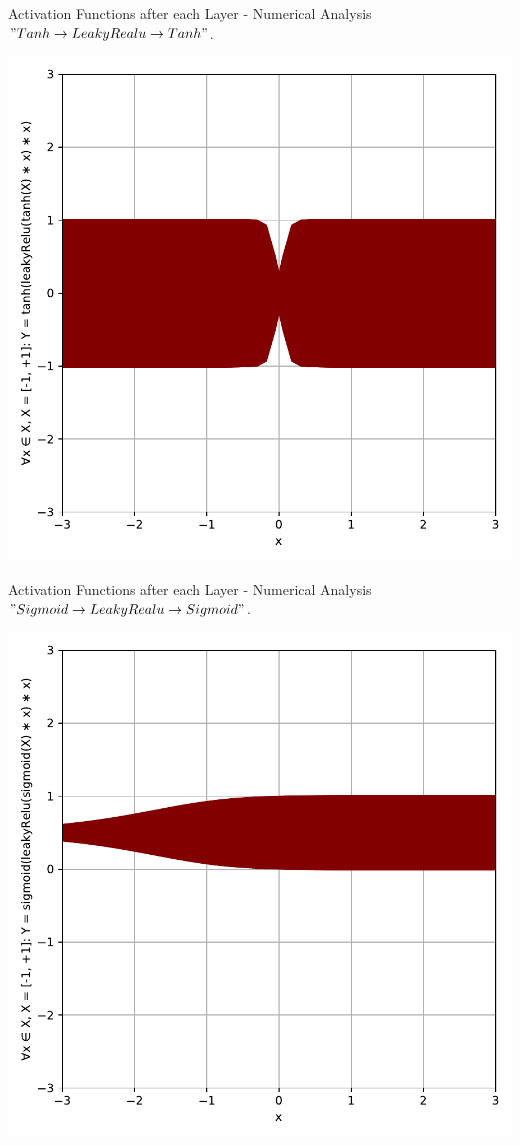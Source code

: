 \documentclass{beamer}
\begin{document}
		\begin{frame}{Activation Functions after each Layer - Numerical Analysis}
			$" Tanh \rightarrow LeakyRealu \rightarrow Tanh "$.
			\begin{center}
				\includegraphics[height=0.9\textheight]{tanh_leakyRelu_tanh}
			\end{center}
		\end{frame}
		\begin{frame}{Activation Functions after each Layer - Numerical Analysis}
			$" Sigmoid \rightarrow LeakyRealu \rightarrow Sigmoid "$.
			\begin{center}
				\includegraphics[height=0.9\textheight]{sigmoid_leakyRelu_sigmoid}
			\end{center}
		\end{frame}
\end{document}
